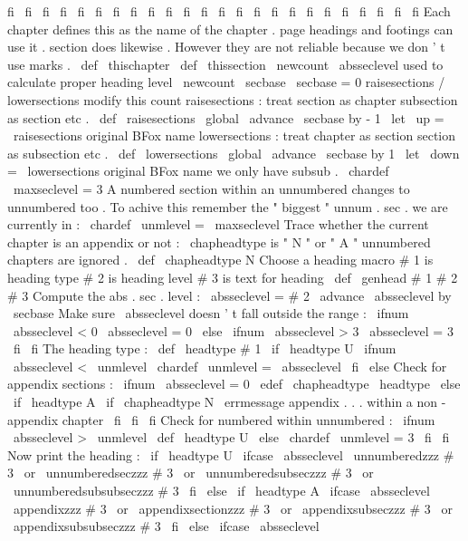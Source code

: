 {{fi
\
fi
\
fi
\
fi
\
fi
\
fi
\
fi
\
fi
\
fi
\
fi
\
fi
\
fi
\
fi
\
fi
\
fi
\
fi
\
fi
\
fi
\
fi
\
fi
\
fi
\
fi
\
fi
\
fi
}
%
Each
chapter
defines
this
as
the
name
of
the
chapter
.
%
page
headings
and
footings
can
use
it
.
section
does
likewise
.
%
However
they
are
not
reliable
because
we
don
'
t
use
marks
.
\
def
\
thischapter
{
}
\
def
\
thissection
{
}
\
newcount
\
absseclevel
%
used
to
calculate
proper
heading
level
\
newcount
\
secbase
\
secbase
=
0
%
raisesections
/
lowersections
modify
this
count
%
raisesections
:
treat
section
as
chapter
subsection
as
section
etc
.
\
def
\
raisesections
{
\
global
\
advance
\
secbase
by
-
1
}
\
let
\
up
=
\
raisesections
%
original
BFox
name
%
lowersections
:
treat
chapter
as
section
section
as
subsection
etc
.
\
def
\
lowersections
{
\
global
\
advance
\
secbase
by
1
}
\
let
\
down
=
\
lowersections
%
original
BFox
name
%
we
only
have
subsub
.
\
chardef
\
maxseclevel
=
3
%
%
A
numbered
section
within
an
unnumbered
changes
to
unnumbered
too
.
%
To
achive
this
remember
the
"
biggest
"
unnum
.
sec
.
we
are
currently
in
:
\
chardef
\
unmlevel
=
\
maxseclevel
%
%
Trace
whether
the
current
chapter
is
an
appendix
or
not
:
%
\
chapheadtype
is
"
N
"
or
"
A
"
unnumbered
chapters
are
ignored
.
\
def
\
chapheadtype
{
N
}
%
Choose
a
heading
macro
%
#
1
is
heading
type
%
#
2
is
heading
level
%
#
3
is
text
for
heading
\
def
\
genhead
#
1
#
2
#
3
{
%
%
Compute
the
abs
.
sec
.
level
:
\
absseclevel
=
#
2
\
advance
\
absseclevel
by
\
secbase
%
Make
sure
\
absseclevel
doesn
'
t
fall
outside
the
range
:
\
ifnum
\
absseclevel
<
0
\
absseclevel
=
0
\
else
\
ifnum
\
absseclevel
>
3
\
absseclevel
=
3
\
fi
\
fi
%
The
heading
type
:
\
def
\
headtype
{
#
1
}
%
\
if
\
headtype
U
%
\
ifnum
\
absseclevel
<
\
unmlevel
\
chardef
\
unmlevel
=
\
absseclevel
\
fi
\
else
%
Check
for
appendix
sections
:
\
ifnum
\
absseclevel
=
0
\
edef
\
chapheadtype
{
\
headtype
}
%
\
else
\
if
\
headtype
A
\
if
\
chapheadtype
N
%
\
errmessage
{
appendix
.
.
.
within
a
non
-
appendix
chapter
}
%
\
fi
\
fi
\
fi
%
Check
for
numbered
within
unnumbered
:
\
ifnum
\
absseclevel
>
\
unmlevel
\
def
\
headtype
{
U
}
%
\
else
\
chardef
\
unmlevel
=
3
\
fi
\
fi
%
Now
print
the
heading
:
\
if
\
headtype
U
%
\
ifcase
\
absseclevel
\
unnumberedzzz
{
#
3
}
%
\
or
\
unnumberedseczzz
{
#
3
}
%
\
or
\
unnumberedsubseczzz
{
#
3
}
%
\
or
\
unnumberedsubsubseczzz
{
#
3
}
%
\
fi
\
else
\
if
\
headtype
A
%
\
ifcase
\
absseclevel
\
appendixzzz
{
#
3
}
%
\
or
\
appendixsectionzzz
{
#
3
}
%
\
or
\
appendixsubseczzz
{
#
3
}
%
\
or
\
appendixsubsubseczzz
{
#
3
}
%
\
fi
\
else
\
ifcase
\
absseclevel
}}
